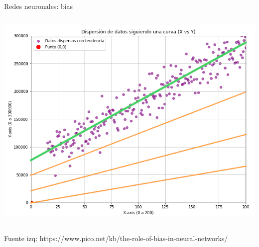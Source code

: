 \begin{frame}{Redes neuronales: bias}
\begin{columns}[c]
\begin{column}{0.4\textwidth}
    \includegraphics[width=\textwidth]{Slides/figures/Introduccion/bias-si-data.png}
\end{column}
\end{columns}

\scriptsize{
Fuente izq: https://www.pico.net/kb/the-role-of-bias-in-neural-networks/
}

\end{frame}


